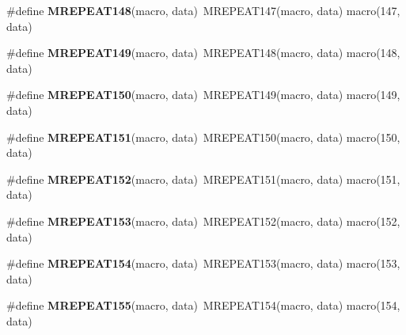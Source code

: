 \begin{DoxyCompactItemize}
\item 
\hypertarget{group__group__sam0__utils__mrepeat_gae6c61eb095a85d084a71dee42aa35eac}{}\#define {\bfseries M\+R\+E\+P\+E\+A\+T148}(macro,  data)~M\+R\+E\+P\+E\+A\+T147(macro, data)   macro(147, data)\label{group__group__sam0__utils__mrepeat_gae6c61eb095a85d084a71dee42aa35eac}

\item 
\hypertarget{group__group__sam0__utils__mrepeat_ga18ca1b3d19447f3bbe8d3d10c5f238b2}{}\#define {\bfseries M\+R\+E\+P\+E\+A\+T149}(macro,  data)~M\+R\+E\+P\+E\+A\+T148(macro, data)   macro(148, data)\label{group__group__sam0__utils__mrepeat_ga18ca1b3d19447f3bbe8d3d10c5f238b2}

\item 
\hypertarget{group__group__sam0__utils__mrepeat_ga4b6a38c831a6d78f44cc9348c496dc5a}{}\#define {\bfseries M\+R\+E\+P\+E\+A\+T150}(macro,  data)~M\+R\+E\+P\+E\+A\+T149(macro, data)   macro(149, data)\label{group__group__sam0__utils__mrepeat_ga4b6a38c831a6d78f44cc9348c496dc5a}

\item 
\hypertarget{group__group__sam0__utils__mrepeat_gad53956dd011ee41e4542fc564f2102f0}{}\#define {\bfseries M\+R\+E\+P\+E\+A\+T151}(macro,  data)~M\+R\+E\+P\+E\+A\+T150(macro, data)   macro(150, data)\label{group__group__sam0__utils__mrepeat_gad53956dd011ee41e4542fc564f2102f0}

\item 
\hypertarget{group__group__sam0__utils__mrepeat_ga6426d25194d019d1aaeca1448aeba07d}{}\#define {\bfseries M\+R\+E\+P\+E\+A\+T152}(macro,  data)~M\+R\+E\+P\+E\+A\+T151(macro, data)   macro(151, data)\label{group__group__sam0__utils__mrepeat_ga6426d25194d019d1aaeca1448aeba07d}

\item 
\hypertarget{group__group__sam0__utils__mrepeat_gac8eb62a598002e65a7aee5ffce9daefb}{}\#define {\bfseries M\+R\+E\+P\+E\+A\+T153}(macro,  data)~M\+R\+E\+P\+E\+A\+T152(macro, data)   macro(152, data)\label{group__group__sam0__utils__mrepeat_gac8eb62a598002e65a7aee5ffce9daefb}

\item 
\hypertarget{group__group__sam0__utils__mrepeat_ga70ba0c83bec304aec635e40497033340}{}\#define {\bfseries M\+R\+E\+P\+E\+A\+T154}(macro,  data)~M\+R\+E\+P\+E\+A\+T153(macro, data)   macro(153, data)\label{group__group__sam0__utils__mrepeat_ga70ba0c83bec304aec635e40497033340}

\item 
\hypertarget{group__group__sam0__utils__mrepeat_gab9b1a8f988e6f8230241c06b25c09851}{}\#define {\bfseries M\+R\+E\+P\+E\+A\+T155}(macro,  data)~M\+R\+E\+P\+E\+A\+T154(macro, data)   macro(154, data)\label{group__group__sam0__utils__mrepeat_gab9b1a8f988e6f8230241c06b25c09851}


\end{DoxyCompactItemize}
